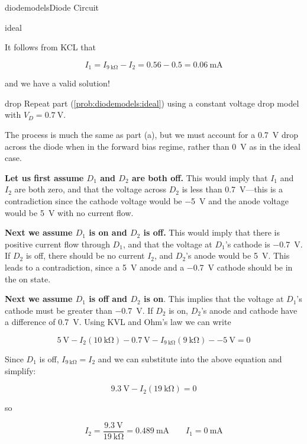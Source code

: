 \begin{mainquestion}{diodemodels}{Diode Circuit}
\begin{partquestion}{ideal}
\begin{answer}
It follows from KCL that

\[
I_1
=
I_{\qty{9}{\kilo\ohm}}-I_2
=
0.56 - 0.5
=
\qty{0.06}{\milli\ampere}
\]

and we have a valid solution!
\end{answer}
\end{partquestion}

\begin{partquestion}{drop}
{Repeat part (\cref{prob:diodemodels:ideal}) using a constant voltage drop model with $V_D = \qty{0.7}{\volt}$.}

\begin{answer}
The process is much the same as part (a), but we must account for a \qty{0.7}{\volt} drop across the diode when in the forward bias regime, rather than \qty{0}{\volt} as in the ideal case.

\textbf{Let us first assume $D_1$ and $D_2$ are both off.} This would imply that $I_1$ and $I_2$ are both zero, and that the voltage across $D_2$ is less than \qty{0.7}{\volt}—this is a contradiction since the cathode voltage would be \qty{-5}{\volt} and the anode voltage would be \qty{5}{\volt} with no current flow.

\textbf{Next we assume $D_1$ is on and $D_2$ is off.} This would imply that there is positive current flow through $D_1$, and that the voltage at $D_1$'s cathode is \qty{-0.7}{\volt}. If $D_2$ is off, there should be no current $I_2$, and $D_2$'s anode would be \qty{5}{\volt}. This leads to a contradiction, since a \qty{5}{\volt} anode and a \qty{-0.7}{\volt} cathode should be in the on state.

\textbf{Next we assume $D_1$ is off and $D_2$ is on}. This implies that the voltage at $D_1$'s cathode must be greater than \qty{-0.7}{\volt}. If $D_2$ is on, $D_2$'s anode and cathode have a difference of \qty{0.7}{\volt}. Using KVL and Ohm's law we can write

\[
\qty{5}{\volt}
-
I_2\left(\qty{10}{\kilo\ohm}\right)
-
\qty{0.7}{\volt}
-
I_{\qty{9}{\kilo\ohm}}\left(\qty{9}{\kilo\ohm}\right)
-
\qty{-5}{\volt}
=
0
\]

Since $D_1$ is off, $I_{\qty{9}{\kilo\ohm}} = I_2$ and we can substitute into the above equation and simplify:

\[
\qty{9.3}{\volt}
-
I_2\left(\qty{19}{\kilo\ohm}\right)
=
0
\]

so

\[
I_2
=
\frac{\qty{9.3}{\volt}}{\qty{19}{\kilo\ohm}}
=
\qty{0.489}{\milli\ampere}
\qquad
I_1 = \qty{0}{\milli\ampere}
\]


\end{answer}
\end{partquestion}
\end{mainquestion}
